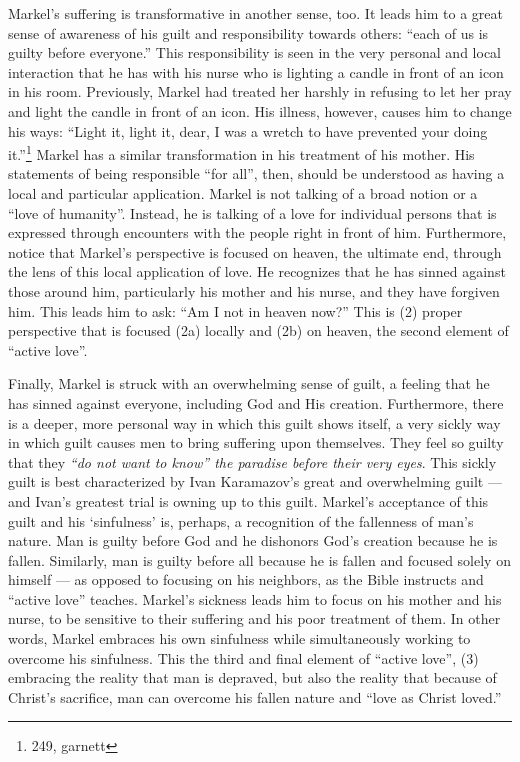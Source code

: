   Markel's suffering is transformative in another sense, too. It leads him to a great sense of awareness of his guilt and responsibility towards others: ``each of us is guilty before everyone.'' This responsibility is seen in the very personal and local interaction that he has with his nurse who is lighting a candle in front of an icon in his room. Previously, Markel had treated her harshly in refusing to let her pray and light the candle in front of an icon. His illness, however, causes him to change his ways: ``Light it, light it, dear, I was a wretch to have prevented your doing it.''\footnote{249, garnett} Markel has a similar transformation in his treatment of his mother. His statements of being responsible ``for all'', then, should be understood as having a local and particular application. Markel is not talking of a broad notion or a ``love of humanity''. Instead, he is talking of a love for individual persons that is expressed through encounters with the people right in front of him. Furthermore, notice that Markel's perspective is focused on heaven, the ultimate end, through the lens of this local application of love. He recognizes that he has sinned against those around him, particularly his mother and his nurse, and they have forgiven him. This leads him to ask: ``Am I not in heaven now?'' This is (2) proper perspective that is focused (2a) locally and (2b) on heaven, the second element of ``active love''.
  
  Finally, Markel is struck with an overwhelming sense of guilt, a feeling that he has sinned against everyone, including God and His creation. Furthermore, there is a deeper, more personal way in which this guilt shows itself, a very sickly way in which guilt causes men to bring suffering upon themselves. They feel so guilty that they \emph{``do not want to know'' the paradise before their very eyes}. This sickly guilt is best characterized by Ivan Karamazov's great and overwhelming guilt --- and Ivan's greatest trial is owning up to this guilt. Markel's acceptance of this guilt and his `sinfulness' is, perhaps, a recognition of the fallenness of man's nature. Man is guilty before God and he dishonors God's creation because he is fallen. Similarly, man is guilty before all because he is fallen and focused solely on himself --- as opposed to focusing on his neighbors, as the Bible instructs and ``active love'' teaches. Markel's sickness leads him to focus on his mother and his nurse, to be sensitive to their suffering and his poor treatment of them. In other words, Markel embraces his own sinfulness while simultaneously working to overcome his sinfulness. This the third and final element of ``active love'', (3) embracing the reality that man is depraved, but also the reality that because of Christ's sacrifice, man can overcome his fallen nature and ``love as Christ loved.''
  
